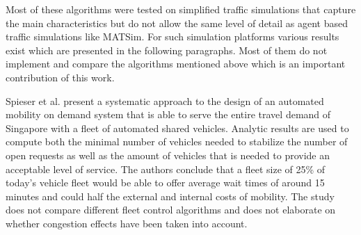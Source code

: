 Most of these algorithms were tested on simplified traffic simulations that capture
the main characteristics but do not allow the same level of detail as agent based
traffic simulations like MATSim. For such simulation platforms various results
exist which are presented in the following paragraphs. Most of them do not
implement and compare the algorithms mentioned above which is an important
contribution of this work.

Spieser et al. \cite{spieser2014toward} present a systematic approach to the
design of an automated mobility on demand system that is able to serve the entire
travel demand of Singapore with a fleet of automated shared vehicles. Analytic
results are used to compute both the minimal number of vehicles needed to stabilize
the number of open requests as well as the amount of vehicles that is needed to
provide an acceptable level of service. The authors conclude that a fleet size
of 25\% of today's vehicle fleet would be able to offer average wait times of
around 15 minutes and could half the external and internal costs of mobility.
The study does not compare different fleet control algorithms and does not
elaborate on whether congestion effects have been taken into account.


